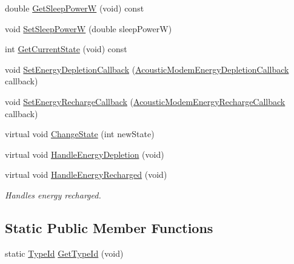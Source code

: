 \begin{DoxyCompactItemize}
double \hyperlink{classns3_1_1AcousticModemEnergyModel_a21675842bdfc083a353146d39593aba8}{Get\+Sleep\+PowerW} (void) const 
\item 
void \hyperlink{classns3_1_1AcousticModemEnergyModel_abf8c0c009a2b90b9e2f9ad77da26e015}{Set\+Sleep\+PowerW} (double sleep\+PowerW)
\item 
int \hyperlink{classns3_1_1AcousticModemEnergyModel_ab3d8e18f563f041efbcc9ca800b1194e}{Get\+Current\+State} (void) const 
\item 
void \hyperlink{classns3_1_1AcousticModemEnergyModel_ac6241dfd9430fd5ada65d37fb08051ec}{Set\+Energy\+Depletion\+Callback} (\hyperlink{classns3_1_1AcousticModemEnergyModel_a04ad0c4c5ea21dc8d221761b734c317b}{Acoustic\+Modem\+Energy\+Depletion\+Callback} callback)
\item 
void \hyperlink{classns3_1_1AcousticModemEnergyModel_a0f1117fac49bcadf15101fdfd1843234}{Set\+Energy\+Recharge\+Callback} (\hyperlink{classns3_1_1AcousticModemEnergyModel_a54a60baedb4014f67531e44ce079f1b1}{Acoustic\+Modem\+Energy\+Recharge\+Callback} callback)
\item 
virtual void \hyperlink{classns3_1_1AcousticModemEnergyModel_abc8069f9d62851c055d740274a1b5bac}{Change\+State} (int new\+State)
\item 
virtual void \hyperlink{classns3_1_1AcousticModemEnergyModel_aa9af4358a1a528e7e77783e0195ebd93}{Handle\+Energy\+Depletion} (void)
\item 
virtual void \hyperlink{classns3_1_1AcousticModemEnergyModel_ab523ba8080020aa5f2aff449a8833190}{Handle\+Energy\+Recharged} (void)
\begin{DoxyCompactList}\small\item\em Handles energy recharged. \end{DoxyCompactList}\end{DoxyCompactItemize}
\subsection*{Static Public Member Functions}
\begin{DoxyCompactItemize}
\item 
static \hyperlink{classns3_1_1TypeId}{Type\+Id} \hyperlink{classns3_1_1AcousticModemEnergyModel_a9261890776d876f46b1d48de27b74443}{Get\+Type\+Id} (void)
\end{DoxyCompactItemize}
